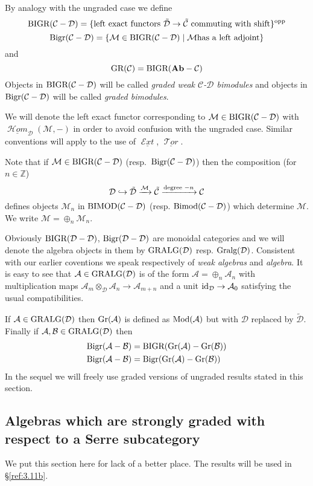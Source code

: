 \documentclass{amsproc}
\def \ZZ{{\mathbb Z}}
\def\Ascr{{\mathcal A}}
\def\Bscr{{\mathcal B}}
\def\Cscr{{\mathcal C}}
\def\Dscr{{\mathcal D}}
\def\Escr{{\mathcal E}}
\def\Hscr{{\mathcal H}}
\def\Mscr{{\mathcal M}}
\def\Tscr{{\mathcal T}}
\def\HHom{\operatorname {\Hscr \mathit{om}}}
\def\HExt{\operatorname {\Escr \mathit{xt}}}
\def\HTor{\operatorname {\Tscr \mathit{or}}}
\def\Ab{\mathbf{Ab}}
\def\Id{\text{id}}
\def\Mod{\mathop{\text{Mod}}}
\def\Bimod{\mathop{\text{Bimod}}}
\def\BIMOD{\mathop{\text{BIMOD}}}
\def\Gr{\mathop{\text{Gr}}}
\def\GR{\mathop{\text{GR}}}
\def\Bigr{\mathop{\text{Bigr}}}
\def\BIGR{\mathop{\text{BIGR}}}
\def\Gralg{\mathop{\text{Gralg}}}
\def\GRALG{\mathop{\text{GRALG}}}
\def\HHom{\operatorname {\Hscr \mathit{om}}}
\def\HExt{\operatorname {\Escr \mathit{xt}}}
\def\HTor{\operatorname {\Tscr \mathit{or}}}
\def\r{\rightarrow}
\let\oldtext\text
\def\text#1{\oldtext{\upshape #1}}
\theoremstyle{definition}
\theoremstyle{remark}
\numberwithin{equation}{section}
\numberwithin{table}{section}
\numberwithin{figure}{section}
\def\Gr{\mathop{\text{Gr}}}
\begin{document}
By analogy with the ungraded case we define
\[
\BIGR(\Cscr-\Dscr)=\{\text{left exact functors $\tilde{\Dscr}\r\tilde{\Cscr}$
  commuting with shift}\}^{\text{opp}}
\]
\[
\Bigr(\Cscr-\Dscr)=\{\Mscr\in\BIGR(\Cscr-\Dscr)\mid\Mscr\text{ has a
  left adjoint}\}
\]
and
\[
\GR(\Cscr)=\BIGR(\Ab-\Cscr)
\]
Objects in $\BIGR(\Cscr-\Dscr)$ will be called \emph{graded weak
 $\Cscr$-$\Dscr$ bimodules} and objects in $\Bigr(\Cscr-\Dscr)$ will
 be called \emph{graded bimodules}.


We will denote the left exact functor corresponding to $\Mscr \in
\BIGR(\Cscr-\Dscr)$ with $\underline{\HHom}_\Dscr(\Mscr,-)$ in order
to avoid confusion with the ungraded case. Similar conventions will
apply to the use of $\underline{\HExt}$, $\underline{\HTor}$. 
 


Note that if $\Mscr\in \BIGR(\Cscr-\Dscr)$ (resp.\ $\Bigr(\Cscr-\Dscr)$)
then the composition (for $n\in\ZZ$)
\[
\Dscr\hookrightarrow \tilde{\Dscr}\xrightarrow{\Mscr} \tilde{\Cscr}
\xrightarrow{ \text{degree $-n$}} \Cscr
\]
defines objects $\Mscr_{n}$ in $\BIMOD(\Cscr-\Dscr)$ (resp.
$\Bimod(\Cscr-\Dscr)$) which determine $\Mscr$. We write
$\Mscr=\oplus_n \Mscr_n$. 

Obviously $\BIGR(\Dscr-\Dscr)$, $\Bigr(\Dscr-\Dscr)$ are monoidal
categories and we will denote the algebra objects in them by
$\GRALG(\Dscr)$ resp. $\Gralg(\Dscr)$. Consistent with our earlier
coventions we speak respectively of \emph{weak algebras} and
\emph{algebra}. It is easy to see that $\Ascr\in \GRALG(\Dscr)$
is of the form $\Ascr=\oplus_n\Ascr_n$ with multiplication maps
$\Ascr_m\otimes_\Dscr\Ascr_n\r\Ascr_{m+n}$ and a unit $\Id_\Dscr\r
\Ascr_0$ satisfying the usual compatibilities. 

If $\Ascr\in \GRALG(\Dscr)$ then $\Gr(\Ascr)$ is defined as
$\Mod(\Ascr)$ but with $\Dscr$ replaced by $\tilde{\Dscr}$. Finally if  
$\Ascr,\Bscr\in\GRALG(\Dscr)$ then 
\begin{align*}
\Bigr(\Ascr-\Bscr)&=\BIGR(\Gr(\Ascr)-\Gr(\Bscr))\\
 \Bigr(\Ascr-\Bscr)&=\Bigr(\Gr(\Ascr)-\Gr(\Bscr))
\end{align*}
In the sequel we will freely use graded versions of ungraded results
stated in this section.

\subsection{Algebras which are strongly graded with respect to a Serre
subcategory}
\label{ref:3.3b}
We put this section here for lack of a better place. The results will
be used in \S\ref{ref:3.11b}.
\end{document}
